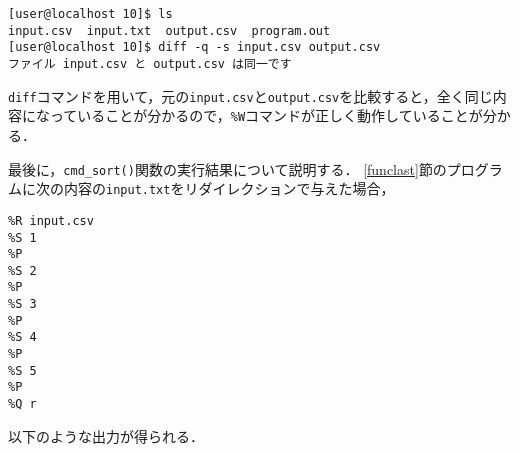 {\fontsize{10pt}{11pt} \selectfont
 \begin{verbatim}
[user@localhost 10]$ ls
input.csv  input.txt  output.csv  program.out
[user@localhost 10]$ diff -q -s input.csv output.csv
ファイル input.csv と output.csv は同一です
 \end{verbatim}
}

\verb|diff|コマンドを用いて，元の\verb|input.csv|と\verb|output.csv|を比較すると，全く同じ内容になっていることが分かるので，\verb|%W|コマンドが正しく動作していることが分かる．

最後に，\verb|cmd_sort()|関数の実行結果について説明する．
\ref{funclast}節のプログラムに次の内容の\verb|input.txt|をリダイレクションで与えた場合，

{\fontsize{10pt}{11pt} \selectfont
 \begin{verbatim}
%R input.csv
%S 1
%P
%S 2
%P
%S 3
%P
%S 4
%P
%S 5
%P
%Q r
 \end{verbatim}
}

\noindent %
以下のような出力が得られる．

